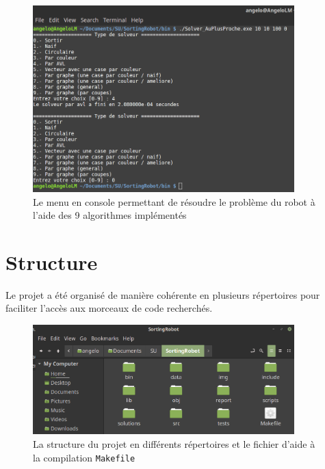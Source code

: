 \documentclass[12pt,a4paper]{article}
\begin{document}
\begin{figure}[!h]
  \centering
  \captionsetup{justification=centering}
  \includegraphics[width=0.9\textwidth]{console}
  \caption[Le menu en console]{Le menu en console permettant de 
	r\'esoudre le probl\`eme du robot \`a l'aide des 9 algorithmes 
impl\'ement\'es}
  \label{fig:console}
\end{figure}

\section*{Structure}
Le projet a \'et\'e organis\'e de mani\`ere coh\'erente en plusieurs 
r\'epertoires pour faciliter l'acc\`es aux morceaux de code recherch\'es.

\begin{figure}[!h]
  \centering
  \captionsetup{justification=centering}
  \includegraphics[width=0.9\textwidth]{structure}
  \caption[La structure projet]{La structure du projet en diff\'erents 
r\'epertoires et le fichier d'aide \`a la compilation \texttt{Makefile}}
  \label{fig:structure}
\end{figure}
\end{document}
